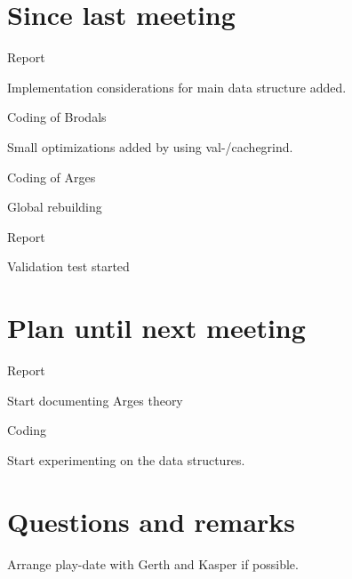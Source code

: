 \documentclass[a4paper,11pt,agenda,chair]{meetingmins}
\begin{document}
\maketitle

\section{Since last meeting}
\begin{items}
\item Report
	\begin{items}
		\item Implementation considerations for main data structure added.
	\end{items}
\item Coding of Brodals
	\begin{items}
		\item Small optimizations added by using val-/cachegrind.
	\end{items}
\item Coding of Arges
	\begin{items}
		\item Global rebuilding
		\item Report
		\item Validation test started
	\end{items}
\end{items}

\section{Plan until next meeting}
\begin{items}
\item Report
	\begin{items}
		\item Start documenting Arges theory
	\end{items}
\item Coding
	\begin{items}
		\item Start experimenting on the data structures.
	\end{items}
\end{items}

\section{Questions and remarks}
\begin{items}
	\item Arrange play-date with Gerth and Kasper if possible.
\end{items}
\end{document}
